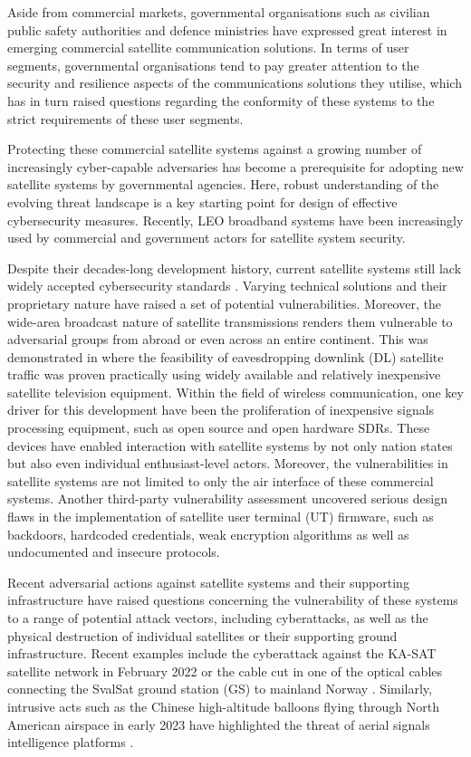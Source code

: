 \documentclass[english, 12pt, a4paper, elec, utf8, a-1b, online]{aaltothesis}
\begin{document}
Aside from commercial markets, governmental organisations such as civilian public safety authorities and defence ministries have expressed great interest in emerging commercial satellite communication solutions.
In terms of user segments, governmental organisations tend to pay greater attention to the security and resilience aspects of the communications solutions they utilise, which has in turn raised questions regarding the conformity of these systems to the strict requirements of these user segments.

Protecting these commercial satellite systems against a growing number of increasingly cyber-capable adversaries has become a prerequisite for adopting new satellite systems by governmental agencies.
Here, robust understanding of the evolving threat landscape is a key starting point for design of effective cybersecurity measures.
Recently, LEO broadband systems have been increasingly used by commercial and government actors for satellite system security.

Despite their decades-long development history, current satellite systems still lack widely accepted cybersecurity standards \cite{lin2022defending}.
Varying technical solutions and their proprietary nature have raised a set of potential vulnerabilities.
Moreover, the wide-area broadcast nature of satellite transmissions renders them vulnerable to adversarial groups from abroad or even across an entire continent.
This was demonstrated in \cite{pavur2020tale} where the feasibility of eavesdropping downlink (DL) satellite traffic was proven practically using widely available and relatively inexpensive satellite television equipment.
Within the field of wireless communication, one key driver for this development have been the proliferation of inexpensive signals processing equipment, such as open source and open hardware SDRs.
These devices have enabled interaction with satellite systems by not only nation states but also even individual enthusiast-level actors.
Moreover, the vulnerabilities in satellite systems are not limited to only the air interface of these commercial systems.
Another third-party vulnerability assessment \cite{santamarta2014wake} uncovered serious design flaws in the implementation of satellite user terminal (UT) firmware, such as backdoors, hardcoded credentials, weak encryption algorithms as well as undocumented and insecure protocols.

Recent adversarial actions against satellite systems and their supporting infrastructure have raised questions concerning the vulnerability of these systems to a range of potential attack vectors, including cyberattacks, as well as the physical destruction of individual satellites or their supporting ground infrastructure.
Recent examples include the cyberattack against the KA-SAT satellite network in February 2022 \cite{boschetti2022space} or the cable cut in one of the optical cables connecting the SvalSat ground station (GS) to mainland Norway \cite{schia2023subsea}.
Similarly, intrusive acts such as the Chinese high-altitude balloons flying through North American airspace in early 2023 have highlighted the threat of aerial signals intelligence platforms \cite{ap-news-2023-02-balloon-signals}.
\end{document}
